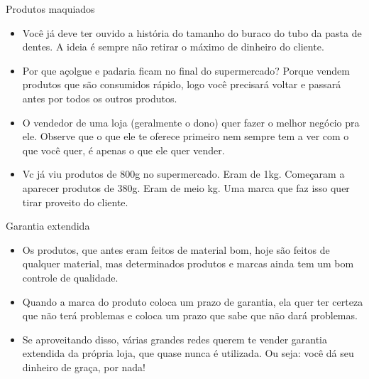 \documentclass[]{beamer}
\begin{document}
  \begin{frame}{Produtos maquiados}

    \begin{itemize}
    \item Você já deve ter ouvido a história do tamanho do
      buraco do tubo da pasta de dentes. A ideia é sempre
      não retirar o máximo de dinheiro do cliente.
      \pause
      \item Por que açolgue e padaria ficam no final do supermercado?
        Porque vendem produtos que são consumidos rápido,
        logo você precisará voltar e passará antes por todos
        os outros produtos.
        \pause
      \item O vendedor de uma loja (geralmente o dono) quer
        fazer o melhor negócio pra ele. Observe que o que
        ele te oferece primeiro nem sempre tem a ver com o
        que você quer, é apenas o que ele quer vender.
        \pause
      \item Vc já viu produtos de 800g no supermercado. Eram
        de 1kg. Começaram a aparecer produtos de 380g. Eram
        de meio kg. Uma marca que faz isso quer tirar
        proveito do cliente.
    \end{itemize}

\end{frame}
\begin{frame}{Garantia extendida}
\begin{itemize}
\item Os produtos, que antes eram feitos de material bom,
  hoje são feitos de qualquer material, mas determinados
  produtos e marcas ainda tem um bom controle de qualidade.
  \pause
  \item Quando a marca do produto coloca um prazo de
    garantia, ela quer ter certeza que não terá problemas e
    coloca um prazo que sabe que não dará problemas.
    \pause
  \item Se aproveitando disso, várias grandes redes querem
    te vender garantia extendida da própria loja, que quase
    nunca é utilizada. Ou seja: você dá seu dinheiro de
    graça, por nada!
\end{itemize}

\end{frame}
\end{document}
